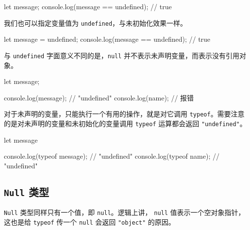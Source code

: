 \begin{JavaScript}
let message;
console.log(message == undefined);  // true
\end{JavaScript}

我们也可以指定变量值为 \texttt{undefined}，与未初始化效果一样。

\begin{JavaScript}
let message = undefined;
console.log(message == undefined);  // true
\end{JavaScript}


与 \texttt{undefined} 字面意义不同的是，\texttt{null} 并不表示未声明变量，而表示没有引用对象。

\begin{JavaScript}
let message;

console.log(message);   // "undefined"
console.log(name);      // 报错
\end{JavaScript}

对于未声明的变量，只能执行一个有用的操作，就是对它调用 \texttt{typeof}。需要注意的是对未声明的变量和未初始化的变量调用 \texttt{typeof} 运算都会返回 \texttt{"undefined"}。

\begin{JavaScript}
let message 

console.log(typeof message);   // "undefined"
console.log(typeof name);      // "undefined"
\end{JavaScript}


\subsection{\texttt{Null} 类型}

\texttt{Null} 类型同样只有一个值，即 \texttt{null}。逻辑上讲， \texttt{null} 值表示一个空对象指针，这也是给 \texttt{typeof} 传一个 \texttt{null} 会返回 \texttt{"object"} 的原因。

